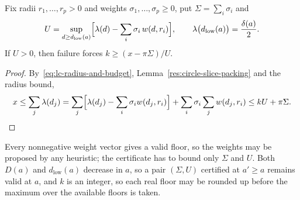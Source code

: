 \begin{theorem}\label{res:dual-arity-floor}
Fix radii $r_1,\ldots,r_p>0$ and weights $\sigma_1,\ldots,\sigma_p\ge0$, put
$\Sigma=\sum_i\sigma_i$ and
\[
 U=\sup_{d\ge d_{\mathrm{low}}(a)}
   \Bigl[\lambda(d)-\sum_i\sigma_i\,w(d,r_i)\Bigr],
 \qquad
 \lambda\bigl(d_{\mathrm{low}}(a)\bigr)=\frac{\delta(a)}2 .
\]
If $U>0$, then failure forces $k\ge(x-\pi\Sigma)/U$.
\end{theorem}

\begin{proof}
By~\eqref{eq:lc-radius-and-budget}, Lemma~\ref{res:circle-slice-packing} and
the radius bound,
\[
 x\le\sum_j\lambda(d_j)
  =\sum_j\Bigl[\lambda(d_j)-\sum_i\sigma_i w(d_j,r_i)\Bigr]
    +\sum_i\sigma_i\sum_j w(d_j,r_i)
  \le kU+\pi\Sigma. \qedhere
\]
\end{proof}

Every nonnegative weight vector gives a valid floor, so the weights may be
proposed by any heuristic; the certificate has to bound only $\Sigma$ and $U$.
Both $D(a)$ and $d_{\mathrm{low}}(a)$ decrease in $a$, so a pair
$(\Sigma,U)$ certified at $a'\ge a$ remains valid at $a$, and $k$ is an
integer, so each real floor may be rounded up before the maximum over the
available floors is taken.


